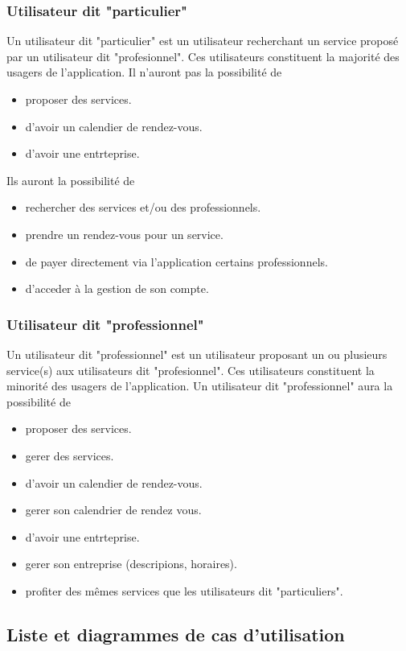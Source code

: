 \documentclass{article}
\begin{document}
\subsubsection{Utilisateur dit "particulier"}
Un utilisateur dit "particulier" est un utilisateur recherchant un service proposé par un utilisateur dit "profesionnel".
Ces utilisateurs constituent la majorité des usagers de l'application.
Il n'auront pas la possibilité de
\begin{itemize}
  \item proposer des services.
  \item d'avoir un calendier de rendez-vous.
  \item d'avoir une entrteprise.
\end{itemize}
Ils auront la possibilité de
\begin{itemize}
  \item rechercher des services et/ou des professionnels.
  \item prendre un rendez-vous pour un service.
  \item de payer directement via l'application certains professionnels.
  \item d'acceder à la gestion de son compte.
\end{itemize}


\subsubsection{Utilisateur dit "professionnel"}
Un utilisateur dit "professionnel" est un utilisateur proposant un ou plusieurs service(s) aux utilisateurs dit "profesionnel".
Ces utilisateurs constituent la minorité des usagers de l'application.
Un utilisateur dit "professionnel" aura la possibilité de
\begin{itemize}
  \item proposer des services.
  \item gerer des services.
  \item d'avoir un calendier de rendez-vous.
  \item gerer son calendrier de rendez vous.
  \item d'avoir une entrteprise.
  \item gerer son entreprise (descripions, horaires).
  \item profiter des mêmes services que les utilisateurs dit "particuliers".
\end{itemize}


\subsection{Liste et diagrammes de cas d'utilisation}
\end{document}
